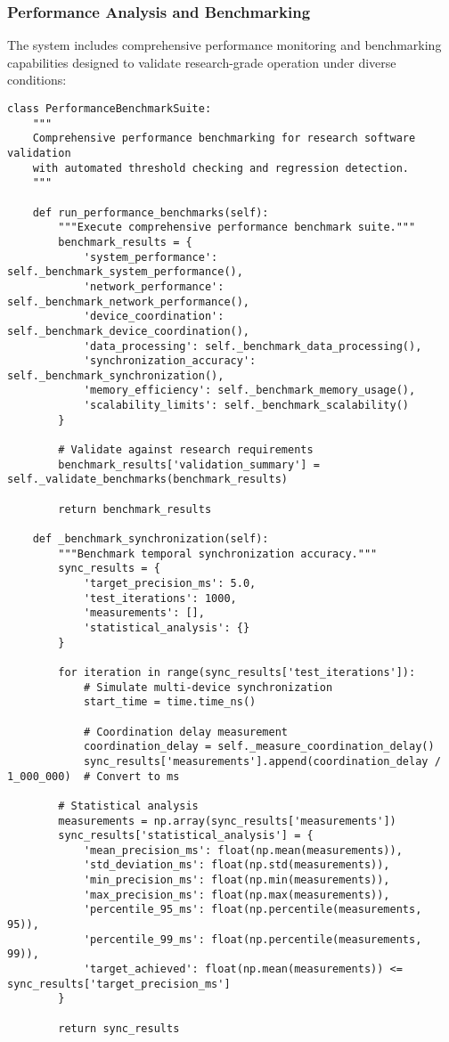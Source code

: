 \documentclass[12pt,a4paper]{article}
\begin{document}
\subsubsection{Performance Analysis and Benchmarking}

The system includes comprehensive performance monitoring and benchmarking capabilities designed to validate
research-grade operation under diverse conditions:

\begin{verbatim}
class PerformanceBenchmarkSuite:
    """
    Comprehensive performance benchmarking for research software validation
    with automated threshold checking and regression detection.
    """
    
    def run_performance_benchmarks(self):
        """Execute comprehensive performance benchmark suite."""
        benchmark_results = {
            'system_performance': self._benchmark_system_performance(),
            'network_performance': self._benchmark_network_performance(),
            'device_coordination': self._benchmark_device_coordination(),
            'data_processing': self._benchmark_data_processing(),
            'synchronization_accuracy': self._benchmark_synchronization(),
            'memory_efficiency': self._benchmark_memory_usage(),
            'scalability_limits': self._benchmark_scalability()
        }
        
        # Validate against research requirements
        benchmark_results['validation_summary'] = self._validate_benchmarks(benchmark_results)
        
        return benchmark_results
    
    def _benchmark_synchronization(self):
        """Benchmark temporal synchronization accuracy."""
        sync_results = {
            'target_precision_ms': 5.0,
            'test_iterations': 1000,
            'measurements': [],
            'statistical_analysis': {}
        }
        
        for iteration in range(sync_results['test_iterations']):
            # Simulate multi-device synchronization
            start_time = time.time_ns()
            
            # Coordination delay measurement
            coordination_delay = self._measure_coordination_delay()
            sync_results['measurements'].append(coordination_delay / 1_000_000)  # Convert to ms
        
        # Statistical analysis
        measurements = np.array(sync_results['measurements'])
        sync_results['statistical_analysis'] = {
            'mean_precision_ms': float(np.mean(measurements)),
            'std_deviation_ms': float(np.std(measurements)),
            'min_precision_ms': float(np.min(measurements)),
            'max_precision_ms': float(np.max(measurements)),
            'percentile_95_ms': float(np.percentile(measurements, 95)),
            'percentile_99_ms': float(np.percentile(measurements, 99)),
            'target_achieved': float(np.mean(measurements)) <= sync_results['target_precision_ms']
        }
        
        return sync_results
\end{verbatim}
\end{document}
